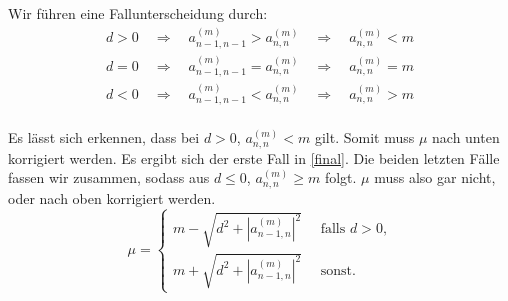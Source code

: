 \documentclass[11pt]{article}
\theoremstyle{plain}
\theoremstyle{definition}
\renewcommand{\a}{\"{a}}
\renewcommand{\u}{\"{u}}
\begin{document}
Wir f\u hren eine Fallunterscheidung durch:
\begin{align*}
d>0 \quad \Rightarrow \quad a_{n-1,n-1}^{(m)} > a_{n,n}^{(m)}  \quad \Rightarrow \quad a_{n,n}^{(m)} < m \\
d=0 \quad \Rightarrow \quad a_{n-1,n-1}^{(m)} = a_{n,n}^{(m)}  \quad \Rightarrow \quad a_{n,n}^{(m)} = m \\
d<0 \quad \Rightarrow \quad a_{n-1,n-1}^{(m)} < a_{n,n}^{(m)}  \quad \Rightarrow \quad a_{n,n}^{(m)} > m \\
\end{align*}

Es l\a sst sich erkennen, dass bei $d>0$, $a_{n,n}^{(m)} < m$ gilt. Somit muss $\mu$ nach unten korrigiert werden. Es ergibt sich der erste Fall in \eqref{final}. Die beiden letzten F\a lle fassen wir zusammen, sodass aus $d\leq 0$, $a_{n,n}^{(m)} \geq m$ folgt. $\mu$ muss also gar nicht, oder nach oben korrigiert werden.
\begin{equation}
\mu = 
\begin{cases}
m - \sqrt{d^2 + |a_{n-1,n}^{(m)}|^2} \quad \text{ falls $d>0$,} \\
m + \sqrt{d^2 + |a_{n-1,n}^{(m)}|^2} \quad \text{ sonst.} 
\end{cases}
\label{final}
\end{equation}
\end{document}
